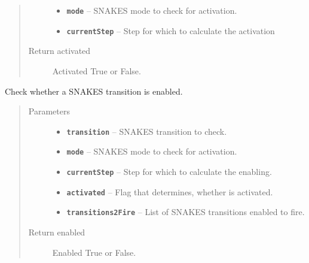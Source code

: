 \documentclass[a4paper,10pt,english]{sphinxmanual}
\begin{document}
\begin{fulllineitems}
\begin{fulllineitems}
\begin{quote}
\begin{description}
\begin{itemize}
\item {} 
\textbf{\texttt{mode}} -- SNAKES mode to check for activation.

\item {} 
\textbf{\texttt{currentStep}} -- Step for which to calculate the activation

\end{itemize}

\item[{Return activated}] \leavevmode
Activated True or False.

\end{description}\end{quote}

\end{fulllineitems}


\begin{fulllineitems}
\label{model_link:model.CPNSimulator.CPNSimulator.checkTransitionEnabled}
Check whether a SNAKES transition is enabled.
\begin{quote}\begin{description}
\item[{Parameters}] \leavevmode\begin{itemize}
\item {} 
\textbf{\texttt{transition}} -- SNAKES transition to check.

\item {} 
\textbf{\texttt{mode}} -- SNAKES mode to check for activation.

\item {} 
\textbf{\texttt{currentStep}} -- Step for which to calculate the enabling.

\item {} 
\textbf{\texttt{activated}} -- Flag that determines, whether  is activated.

\item {} 
\textbf{\texttt{transitions2Fire}} -- List of SNAKES transitions enabled to fire.

\end{itemize}

\item[{Return enabled}] \leavevmode
Enabled True or False.

\end{description}\end{quote}


\end{fulllineitems}
\end{fulllineitems}
\end{document}
